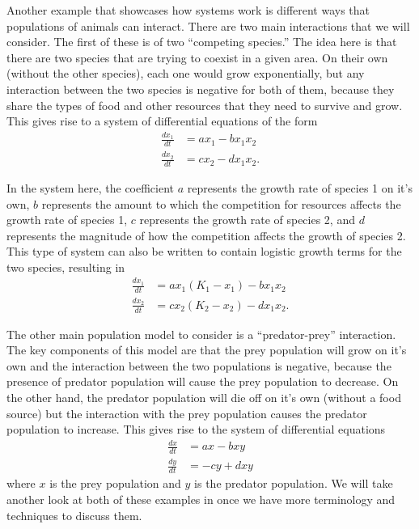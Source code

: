 \documentclass{ximera}
\begin{document}
\begin{example} \label{sintro:pop-example}
    Another example that showcases how systems work is different ways that populations of animals can interact. There are two main interactions that we will consider. The first of these is of two ``competing species.'' The idea here is that there are two species that are trying to coexist in a given area. On their own (without the other species), each one would grow exponentially, but any interaction between the two species is negative for both of them, because they share the types of food and other resources that they need to survive and grow. This gives rise to a system of differential equations of the form
    \[ 
        \begin{split}
            \frac{dx_1}{dt} &= ax_1 - bx_1x_2 \\
            \frac{dx_2}{dt} &= cx_2 - dx_1x_2.
        \end{split} 
    \]
    
    In the system here, the coefficient $a$ represents the growth rate of species 1 on it's own, $b$ represents the amount to which the competition for resources affects the growth rate of species 1, $c$ represents the growth rate of species 2, and $d$ represents the magnitude of how the competition affects the growth of species 2. This type of system can also be written to contain logistic growth terms for the two species, resulting in 
    \[ 
        \begin{split}
            \frac{dx_1}{dt} &= ax_1(K_1 - x_1) - bx_1x_2 \\
            \frac{dx_2}{dt} &= cx_2(K_2 - x_2) - dx_1x_2.
        \end{split} 
    \]
    
    The other main population model to consider is a ``predator-prey'' interaction. The key components of this model are that the prey population will grow on it's own and the interaction between the two populations is negative, because the presence of predator population will cause the prey population to decrease. On the other hand, the predator population will die off on it's own (without a food source) but the interaction with the prey population causes the predator population to increase. This gives rise to the system of differential equations
    \[
        \begin{split}
            \frac{dx}{dt} &= ax - bxy \\
            \frac{dy}{dt} &= -cy + dxy
        \end{split}
    \]
    where $x$ is the prey population and $y$ is the predator population. We will take another look at both of these examples in  once we have more terminology and techniques to discuss them.
\end{example}
\end{document}
